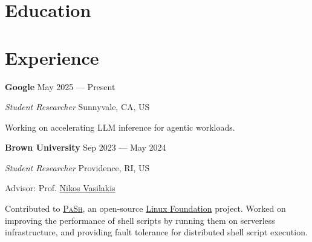 \documentclass[margin,12pt]{resume}
\newcommand{\descriptionVSpace}{\vspace{0.5ex}\xspace}
\newcommand{\subsectionVSpace}{\vspace{3.5ex}\xspace}
\newcommand{\sectionVSpace}{\vspace{1ex}\xspace} %
\newcommand{\pash}{\textsc{PaSh}\xspace}
\newcommand{\sectionVSpaceCorrection}{\vspace{-3.5ex}} %
\newcommand{\header}[1]{\textbf{#1}\xspace}
\newcommand{\company}[1]{\header{#1}\xspace}
\newcommand{\interval}[2]{#1 --- #2\xspace}
\newcommand{\place}[1]{#1\xspace}
\newcommand{\role}[1]{\textit{#1}\xspace}
\newcommand{\stitle}[1]{#1:\xspace}
\newenvironment{rSubsection}{}{\par\subsectionVSpace}
\newenvironment{rSection}[1]{\sectionVSpaceCorrection\section{#1}\xspace}{\sectionVSpace\par}
\newenvironment{jobDuties}{\descriptionVSpace}{\par}
\begin{document}
\begin{resume}
\begin{rSection}{Education}
\begin{rSubsection}
        \end{rSubsection}
    \end{rSection}

    \begin{rSection}{Experience}
        \begin{rSubsection}
            \company{Google} \hfill \interval{May 2025}{Present}

            \role{Student Researcher} \hfill \place{Sunnyvale, CA, US}


            \begin{jobDuties}
                Working on accelerating LLM inference for agentic workloads.
            \end{jobDuties}
        \end{rSubsection}

        \begin{rSubsection}
            \company{Brown University} \hfill \interval{Sep 2023}{May 2024}

            \role{Student Researcher} \hfill \place{Providence, RI, US}

            \stitle{Advisor} Prof. \href{https://nikos.vasilak.is}{Nikos Vasilakis}

            \begin{jobDuties}
                Contributed to \href{https://binpa.sh}{\pash}, an open-source \href{https://www.linuxfoundation.org/press/press-release/linux-foundation-to-host-the-pash-project-accelerating-shell-scripting-with-automated-parallelization-for-industrial-use-cases}{Linux Foundation} project. 
                Worked on improving the performance of shell scripts by running them on serverless infrastructure, and providing fault tolerance for distributed shell script execution.
            \end{jobDuties}
        \end{rSubsection}





\end{rSection}
\end{resume}
\end{document}
